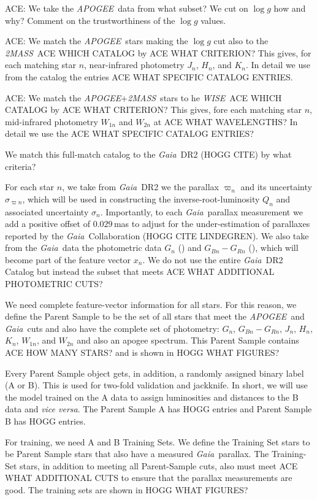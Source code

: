 \documentclass[modern]{aastex62}
\newcommand{\code}[1]{\texttt{\detokenize{#1}}}
\newcommand{\foreign}[1]{\textsl{#1}}
\newcommand{\acronym}[1]{{\small{#1}}}
\newcommand{\project}[1]{\textsl{#1}}
\newcommand{\apogee}{\project{\acronym{APOGEE}}}
\newcommand{\gaia}{\project{Gaia}}
\newcommand{\wise}{\project{\acronym{WISE}}}
\newcommand{\zmass}{\project{\acronym{2MASS}}}
\newcommand{\logg}{\log g}
\begin{document}
ACE: We take the \apogee\ data from what subset?
We cut on $\logg$ how and why? Comment on the trustworthiness of the $\logg$ values.

ACE: We match the \apogee\ stars making the $\logg$ cut also to
the \zmass\ ACE WHICH CATALOG by ACE WHAT CRITERION?
This gives, for each matching star $n$,
near-infrared photometry $J_n$, $H_n$, and $K_n$.
In detail we use from the catalog the entries ACE WHAT SPECIFIC CATALOG ENTRIES.

ACE: We match the \apogee+\zmass\ stars to he \wise\ ACE WHICH CATALOG by ACE WHAT CRITERION?
This gives, fore each matching star $n$,
mid-infrared photometry $W_{1n}$ and $W_{2n}$ at ACE WHAT WAVELENGTHS?
In detail we use the ACE WHAT SPECIFIC CATALOG ENTRIES?

We match this full-match catalog to the \gaia\ \acronym{DR2} (HOGG CITE) by what criteria?

For each star $n$, we take from \gaia\ DR2 we the parallax $\varpi_n$
and its uncertainty $\sigma_{\varpi n}$, which will be used in
constructing the inverse-root-luminosity $Q_n$ and associated
uncertainty $\sigma_n$.
Importantly, to each \gaia\ parallax measurement we add a positive
offset of $0.029$\,mas to adjust for the under-estimation of
parallaxes reported by the \gaia\ Collaboration (HOGG CITE LINDEGREN).
We also take from the \gaia\ data the photometric data $G_n$
(\code{phot_g_mean_mag}) and $G_{Bn}-G_{Rn}$ (\code{bp_rp}), which will
become part of the feature vector $x_n$.
We do not use the entire \gaia\ \acronym{DR2} Catalog but instead the subset
that meets ACE WHAT ADDITIONAL PHOTOMETRIC CUTS?

We need complete feature-vector information for all stars.  For this
reason, we define the Parent Sample to be the set of all stars that
meet the \apogee\ and \gaia\ cuts and also
have the complete set of photometry: $G_n$, $G_{Bn}-G_{Rn}$, $J_n$,
$H_n$, $K_n$, $W_{1n}$, and $W_{2n}$ and also an apogee spectrum.
This Parent Sample contains ACE HOW MANY STARS? and is shown in HOGG WHAT FIGURES?

Every Parent Sample object gets, in addition, a randomly assigned binary
label (A or B).
This is used for two-fold validation and jackknife.
In short, we will use the model trained on the A data to assign luminosities
and distances to the B data and \foreign{vice versa}.
The Parent Sample A has HOGG entries and Parent Sample B has HOGG entries.

For training, we need A and B Training Sets.
We define the Training Set stars to be Parent Sample stars that also
have a measured \gaia\ parallax.
The Training-Set stars, in addition to meeting all Parent-Sample cuts,
also must meet ACE WHAT ADDITIONAL CUTS to ensure that the parallax
measurements are good.
The training sets are shown in HOGG WHAT FIGURES?
\end{document}

